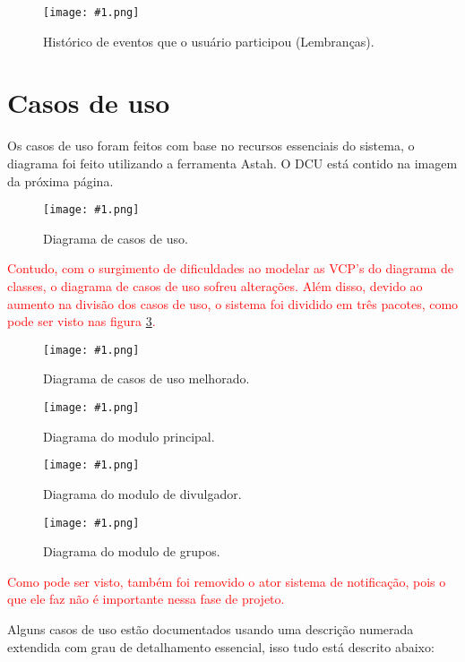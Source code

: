 \documentclass{article}
\newcommand{\diagrama}[2]
{
 \begin{figure}[H]
 \begin{center}
 \texttt{[image: \#1.png]}
 \end{center}
 \caption{#2}
 \label{fig:#1}
 \end{figure}
}
\newcommand{\telasmart}[2]
{
 \begin{figure}[H]
 \begin{center}
 \texttt{[image: \#1.png]}
 \end{center}
 \caption{#2}
 \label{fig:#1}
 \end{figure}
}
\begin{document}
\telasmart{hist_eventos}{Histórico de eventos que o usuário participou (Lembranças).}
 
\section{Casos de uso} \bigskip

Os casos de uso foram feitos com base no recursos essenciais do sistema, o diagrama foi feito utilizando a ferramenta Astah. O DCU está contido na imagem da próxima página.

\diagrama{usecase}{Diagrama de casos de uso.}
\pagebreak

\textcolor{red}{
	Contudo, com o surgimento de dificuldades ao modelar as VCP's do diagrama de classes, o diagrama de casos de uso sofreu alterações. Além disso, devido ao aumento na divisão dos casos de uso, o sistema foi dividido em três pacotes, como pode ser visto nas figura \ref{fig:usecase2}.
}
	\diagrama{usecase2}{Diagrama de casos de uso melhorado.}
	\diagrama{usecase21}{Diagrama do modulo principal.}
	\diagrama{usecase22}{Diagrama do modulo de divulgador.}
	\diagrama{usecase23}{Diagrama do modulo de grupos.}
	
\textcolor{red}{
	Como pode ser visto, também foi removido o ator sistema de notificação, pois o que ele faz não é importante nessa fase de projeto.
}

Alguns casos de uso estão documentados usando uma descrição numerada extendida com grau de detalhamento essencial, isso tudo está descrito abaixo: 
\end{document}
